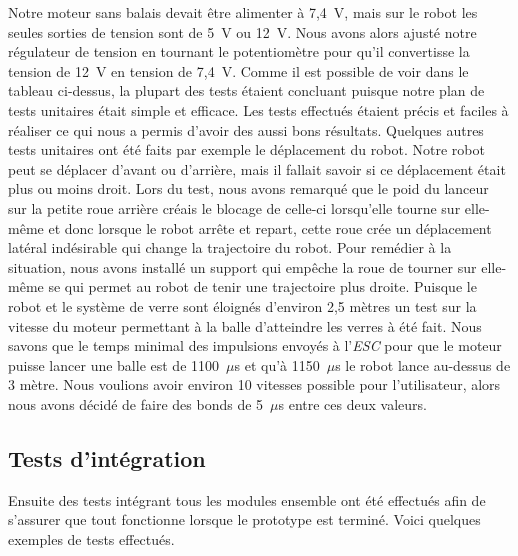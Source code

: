 Notre moteur sans balais devait être alimenter à 7,4~V, mais sur le robot les seules sorties de tension sont de 5~V ou 12~V.
Nous avons alors ajusté notre régulateur de tension en tournant le potentiomètre pour qu’il convertisse la tension de 12~V en tension de 7,4~V.
Comme il est possible de voir dans le tableau ci-dessus, la plupart des tests étaient concluant puisque notre plan de tests unitaires était simple et efficace.
Les tests effectués étaient précis et faciles à réaliser ce qui nous a permis d’avoir des aussi bons résultats.
Quelques autres tests unitaires ont été faits par exemple le déplacement du robot.
Notre robot peut se déplacer d’avant ou d’arrière, mais il fallait savoir si ce déplacement était plus ou moins droit.
Lors du test, nous avons remarqué que le poid du lanceur sur la petite roue arrière créais le blocage de celle-ci lorsqu’elle tourne sur elle-même et donc lorsque le robot arrête et repart, cette roue crée un déplacement latéral indésirable qui change la trajectoire du robot.
Pour remédier à la situation, nous avons installé un support qui empêche la roue de tourner sur elle-même se qui permet au robot de tenir une trajectoire plus droite.
Puisque le robot et le système de verre sont éloignés d’environ 2,5 mètres un test sur la vitesse du moteur permettant à la balle d’atteindre les verres à été fait.
Nous savons que le temps minimal des impulsions envoyés à l'\emph{ESC} pour que le moteur puisse lancer une balle est de 1100~$\mu$s et qu’à 1150~$\mu$s le robot lance au-dessus de 3 mètre.
Nous voulions avoir environ 10 vitesses possible pour l’utilisateur, alors nous avons décidé de faire des bonds de 5~$\mu$s entre ces deux valeurs.

\subsection{Tests d'intégration}

Ensuite des tests intégrant tous les modules ensemble ont été effectués afin de s’assurer que tout fonctionne lorsque le prototype est terminé.
Voici quelques exemples de tests effectués.


